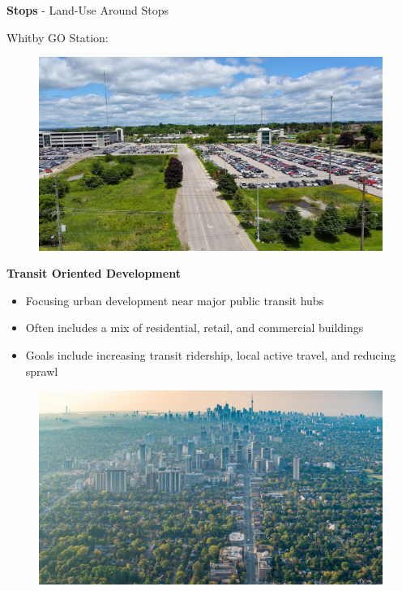 \documentclass[aspectratio=169]{beamer}
\begin{document}
\begin{frame}
	
	\textbf{Stops} - Land-Use Around Stops
	
	\vspace{2mm}
	
	Whitby GO Station:
	\begin{figure}
		\centering
		\includegraphics[width=0.98\linewidth]{images/whitby.jpg}
	\end{figure}
	
\end{frame}




\begin{frame}
	
	\textbf{Transit Oriented Development}
	\begin{itemize}
		\item Focusing urban development near major public transit hubs
		\item Often includes a mix of residential, retail, and commercial buildings
		\item Goals include increasing transit ridership, local active travel, and reducing sprawl
	\end{itemize}

	\begin{figure}
		\centering
		\includegraphics[width=0.78\linewidth]{images/i3.png}
	\end{figure}
		
\end{frame}
\end{document}
